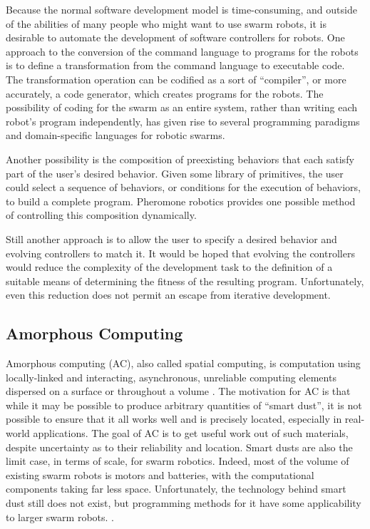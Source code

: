 Because the normal software development model is time-consuming, and outside of the abilities of many people who might want to use swarm robots, it is desirable to automate the development of software controllers for robots. 
One approach to the conversion of the command language to programs for the robots is to define a transformation from the command language to executable code. 
The transformation operation can be codified as a sort of ``compiler'', or more accurately, a code generator, which creates programs for the robots. 
The possibility of coding for the swarm as an entire system, rather than writing each robot's program independently, has given rise to several programming paradigms and domain-specific languages for robotic swarms. 

Another possibility is the composition of preexisting behaviors that each satisfy part of the user's desired behavior. 
Given some library of primitives, the user could select a sequence of behaviors, or conditions for the execution of behaviors, to build a complete program. 
Pheromone robotics provides one possible method of controlling this composition dynamically.
 
Still another approach is to allow the user to specify a desired behavior and evolving controllers to match it. 
It would be hoped that evolving the controllers would reduce the complexity of the development task to the definition of a suitable means of determining the fitness of the resulting program. 
Unfortunately, even this reduction does not permit an escape from iterative development. 

\subsection{Amorphous Computing} \label{section:Amorphous_Computing}

Amorphous computing (AC), also called spatial computing, is computation using locally-linked and interacting, asynchronous, unreliable computing elements dispersed on a surface or throughout a volume \citep{abelson2000amorphous}. 
The motivation for AC is that while it may be possible to produce arbitrary quantities of ``smart dust'', it is not possible to ensure that it all works well and is precisely located, especially in real-world applications.
The goal of AC is to get useful work out of such materials, despite uncertainty as to their reliability and location. 
Smart dusts are also the limit case, in terms of scale, for swarm robotics. 
Indeed, most of the volume of existing swarm robots is motors and batteries, with the computational components taking far less space. 
Unfortunately, the technology behind smart dust still does not exist, but programming methods for it have some applicability to larger swarm robots. \citep{Correll:2017:WRM:3131672.3131702}. 

